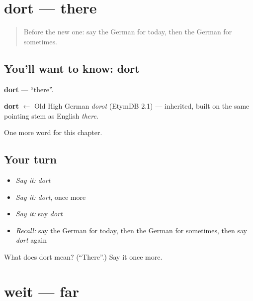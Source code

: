 \section[dort]{dort — there}

\label{lesson:GE-C95-dort}



\begin{quote}
Before the new one: say the German for today, then the German for sometimes.
\end{quote}

\subsection*{You'll want to know: dort}
\textbf{dort} — \textquotedblleft{}there\textquotedblright{}.

\begin{cousinweb}
\textbf{dort} $\leftarrow$ Old High German \emph{dorot} (EtymDB 2.1) — inherited, built on the same pointing stem as English \emph{there}.
\end{cousinweb}

\begin{grammarlens}[title={What you've built}]
One more word for this chapter.
\end{grammarlens}

\subsection*{Your turn}
\begin{itemize}
\raggedright
  \item \emph{Say it:} \emph{dort}
  \item \emph{Say it:} \emph{dort}, once more
  \item \emph{Say it:} say \emph{dort}
  \item \emph{Recall:} say the German for today, then the German for sometimes, then say \emph{dort} again
\end{itemize}

\begin{tcolorbox}[breakable,colback=teal!4,colframe=teal!35!black,title={Before you move on}]
What does dort mean? (\textquotedblleft{}There\textquotedblright{}.) Say it once more.
\end{tcolorbox}
\section[weit]{weit — far}

